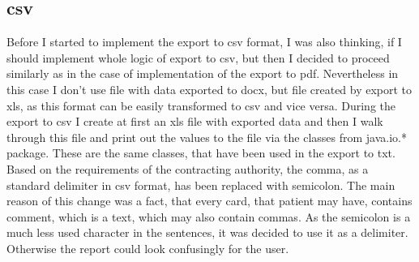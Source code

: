 \documentclass[thesis=B,english]{FITthesis}[2012/10/20]
\begin{document}
\subsection{csv}
Before I started to implement the export to csv format, I was also thinking, if I should implement whole logic of export to csv, but then I decided to proceed similarly as in the case of implementation of the export to pdf. Nevertheless in this case I don't use file with data exported to docx, but file created by export to xls, as this format can be easily transformed to csv and vice versa. During the export to csv I create at first an xls file with exported data and then I walk through this file and print out the values to the file via the classes from java.io.* package. These are the same classes, that have been used in the export to txt. Based on the requirements of the contracting authority, the comma, as a standard delimiter in csv format, has been replaced with semicolon. The main reason of this change was a fact, that every card, that patient may have, contains comment, which is a text, which may also contain commas. As the semicolon is a much less used character in the sentences, it was decided to use it as a delimiter. Otherwise the report could look confusingly for the user.
\end{document}
